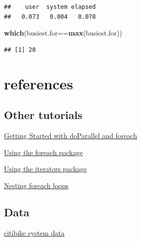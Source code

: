 \documentclass[]{article}
\newenvironment{Shaded}{\begin{snugshade}}{\end{snugshade}}
\newcommand{\KeywordTok}[1]{\textcolor[rgb]{0.13,0.29,0.53}{\textbf{{#1}}}}
\newcommand{\NormalTok}[1]{{#1}}
\begin{document}
\begin{verbatim}
##    user  system elapsed 
##   0.073   0.004   0.078
\end{verbatim}

\begin{Shaded}
\begin{Highlighting}[]
\KeywordTok{which}\NormalTok{(busiest.for==}\KeywordTok{max}\NormalTok{(busiest.for))    }
\end{Highlighting}
\end{Shaded}

\begin{verbatim}
## [1] 20
\end{verbatim}

\section{{references}}\label{references}

\subsection{Other tutorials}\label{other-tutorials}

\href{http://cran.r-project.org/web/packages/doParallel/vignettes/gettingstartedParallel.pdf}{Getting
Started with doParallel and foreach}

\href{http://cran.r-project.org/web/packages/foreach/vignettes/foreach.pdf}{Using
the foreach package}

\href{http://cran.r-project.org/web/packages/iterators/vignettes/iterators.pdf}{Using
the iterators package}

\href{http://cran.r-project.org/web/packages/foreach/vignettes/nested.pdf}{Nesting
foreach loops}

\subsection{Data}\label{data-1}

\href{https://www.citibikenyc.com/system-data}{citibike system data}
\end{document}
